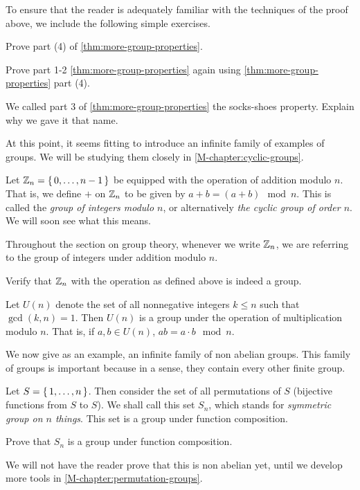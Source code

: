 \documentclass[./main.tex]{subfiles}
\begin{document}
To ensure that the reader is adequately familiar with the techniques of the proof above,
we include the following simple exercises. 
\begin{exercise}
\label{exercise:group-cancellation-law}
Prove part (4) of \cref{thm:more-group-properties}.
\end{exercise}

\begin{exercise}
    Prove part 1-2 \cref{thm:more-group-properties} again using \cref{thm:more-group-properties} part (4).
\end{exercise}

\begin{exercise}
    We called part 3 of \cref{thm:more-group-properties} the socks-shoes
    property. Explain why we gave it that name. 
\end{exercise}

At this point, it seems fitting to introduce an infinite family of examples of
groups. We will be studying them closely in \cref{M-chapter:cyclic-groups}. 
\begin{example}
    Let $\mathbb{Z}_n = \set{0, \dots, n-1}$ be equipped with the operation of addition
    modulo $n$. That is, we define $+$ on $\mathbb{Z}_n$ to be given by $a + b = (a +
    b) \mod n$. This is called the \emph{group of integers modulo $n$}, or
    alternatively \emph{the cyclic group of order $n$}. We will soon see what
    this means.
\end{example}
Throughout the section on group theory, whenever we write $\mathbb{Z}_n$, we are
referring to the group of integers under addition modulo $n$. 

\begin{exercise}
    Verify that $\mathbb{Z}_n$ with the operation as defined above is indeed a group.
\end{exercise}

\begin{example}
    Let $U(n)$ denote the set of all nonnegative integers $k \leq n$ such that
    $\gcd(k, n) = 1$. Then $U(n)$ is a group under the operation of
    multiplication modulo $n$. That is, if $a, b \in U(n)$, $ab = a \cdot b \mod
    n$.
\end{example}

We now give as an example, an infinite family of non abelian groups. This family
of groups is important because in a sense, they contain every other finite
group. 
\begin{example}
\label{example:symmetric-groups}
    Let $S = \set{1, \dots, n}$. Then consider the set of all permutations of
    $S$ (bijective functions from $S$ to $S$). We shall call this set $S_n$,
    which stands for \emph{symmetric group on $n$ things}. This set is a group
    under function composition.
\end{example}
\begin{exercise}
    Prove that $S_n$ is a group under function composition.
\end{exercise}
We will not have the reader prove that this is non abelian yet, until we develop
more tools in \cref{M-chapter:permutation-groups}.
\end{document}

